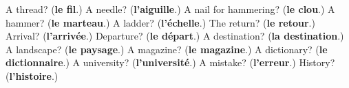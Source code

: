 \begin{tcolorbox}[breakable,colback=teal!4,colframe=teal!35!black,title={Before you move on}]
A thread? (\textbf{le fil}.) A needle? (\textbf{l'aiguille}.) A nail for hammering? (\textbf{le clou}.) A hammer? (\textbf{le marteau}.) A ladder? (\textbf{l'échelle}.) The return? (\textbf{le retour}.) Arrival? (\textbf{l'arrivée}.) Departure? (\textbf{le départ}.) A destination? (\textbf{la destination}.) A landscape? (\textbf{le paysage}.) A magazine? (\textbf{le magazine}.) A dictionary? (\textbf{le dictionnaire}.) A university? (\textbf{l'université}.) A mistake? (\textbf{l'erreur}.) History? (\textbf{l'histoire}.)
\end{tcolorbox}
